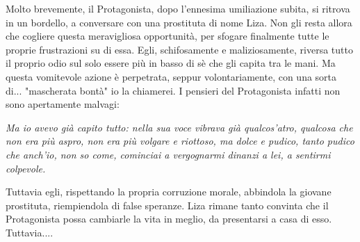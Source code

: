 \documentclass[12pt,a4paper]{report}
\theoremstyle{definition}
\theoremstyle{Theorem}
\theoremstyle{definition}
\theoremstyle{definition}
\theoremstyle{definition}
\begin{document}
Molto brevemente, il Protagonista, dopo l'ennesima umiliazione subita, si ritrova in un bordello, a conversare con una prostituta di nome Liza. Non gli resta allora che cogliere questa meravigliosa opportunità, per sfogare finalmente tutte le proprie frustrazioni su di essa. Egli, schifosamente e maliziosamente, riversa tutto il proprio odio sul solo essere più in basso di sè che gli capita tra le mani. Ma questa vomitevole azione è perpetrata, seppur volontariamente, con una sorta di... "mascherata bontà" io la chiamerei. I pensieri del Protagonista infatti non sono apertamente malvagi:
\begin{center}
	\textit{Ma io avevo già capito tutto: nella sua voce vibrava già qualcos'atro, qualcosa che non era più aspro, non era più volgare e riottoso, ma dolce e pudico, tanto pudico che anch'io, non so come, cominciai a vergognarmi dinanzi a lei, a sentirmi colpevole.}
\end{center}
Tuttavia egli, rispettando la propria corruzione morale, abbindola la giovane prostituta, riempiendola di false speranze. Liza rimane tanto convinta che il Protagonista possa cambiarle la vita in meglio, da presentarsi a casa di esso. Tuttavia....
\end{document}
